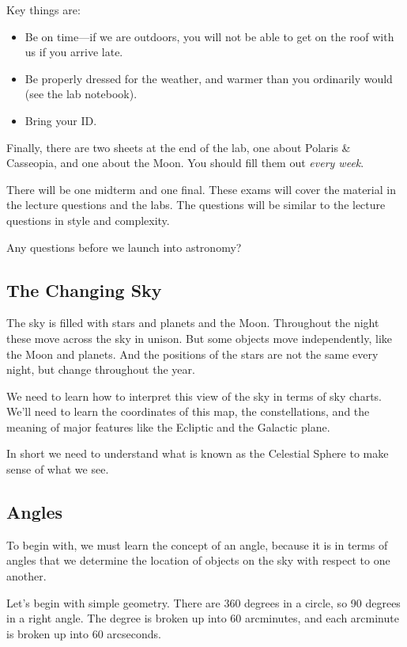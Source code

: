 \documentclass[12pt, preprint]{aastex}
\begin{document}
Key things are:
\begin{itemize}
\item Be on time---if we are outdoors, you will not be able to get on
  the roof with us if you arrive late.
\item Be properly dressed for the weather, and warmer than you
  ordinarily would (see the lab notebook).
\item Bring your ID.
\end{itemize}

Finally, there are two sheets at the end of the lab, one about Polaris
\& Casseopia, and one about the Moon. You should fill them out {\it
  every week}.

There will be one midterm and one final. These exams will cover the
material in the lecture questions and the labs. The questions will be
similar to the lecture questions in style and complexity.

Any questions before we launch into astronomy?

\subsection{The Changing Sky}

The sky is filled with stars and planets and the Moon. Throughout the
night these move across the sky in unison.  But some objects move
independently, like the Moon and planets. And the positions of the
stars are not the same every night, but change throughout the year.

We need to learn how to interpret this view of the sky in terms of sky
charts. We'll need to learn the coordinates of this map, the
constellations, and the meaning of major features like the Ecliptic
and the Galactic plane.

In short we need to understand what is known as the Celestial Sphere
to make sense of what we see.

\subsection{Angles}

To begin with, we must learn the concept of an angle, because it is in
terms of angles that we determine the location of objects on the sky
with respect to one another.

Let's begin with simple geometry. There are 360 degrees in a circle,
so 90 degrees in a right angle. The degree is broken up into 60
arcminutes, and each arcminute is broken up into 60 arcseconds. 
\end{document}
